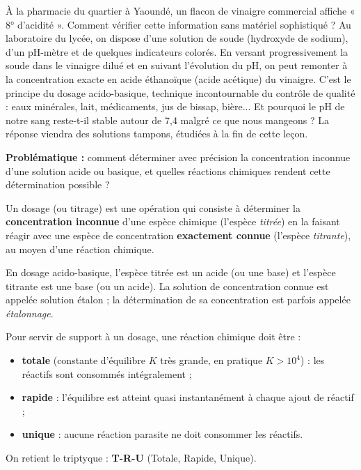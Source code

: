 \documentclass[11pt]{article}
\newcommand{\cle}[1]{{\popxbold\color{popdark}#1}}
\newcounter{popsec}
\newcounter{popsub}
\newcommand{\courssub}[1]{%
  \stepcounter{popsub}%
  \par\vspace{9pt}\noindent{\popxbold\fontsize{11.5}{13}\selectfont\color{popink}{\color{poporange}\thepopsec.\thepopsub}\hspace{6pt}#1}\par\nopagebreak\vspace{4pt}
}
\begin{document}
À la pharmacie du quartier à Yaoundé, un flacon de vinaigre commercial affiche « 8° d'acidité ». Comment vérifier cette information sans matériel sophistiqué ? Au laboratoire du lycée, on dispose d'une solution de soude (hydroxyde de sodium), d'un pH-mètre et de quelques indicateurs colorés. En versant progressivement la soude dans le vinaigre dilué et en suivant l'évolution du pH, on peut remonter à la concentration exacte en acide éthanoïque (acide acétique) du vinaigre. C'est le principe du \cle{dosage acido-basique}, technique incontournable du contrôle de qualité : eaux minérales, lait, médicaments, jus de bissap, bière... Et pourquoi le pH de notre sang reste-t-il stable autour de 7,4 malgré ce que nous mangeons ? La réponse viendra des \cle{solutions tampons}, étudiées à la fin de cette leçon.

\textbf{Problématique :} comment déterminer avec précision la concentration inconnue d'une solution acide ou basique, et quelles réactions chimiques rendent cette détermination possible ?

\courssub{La notion de dosage (titrage)}

\begin{definition}
Un \cle{dosage} (ou \cle{titrage}) est une opération qui consiste à déterminer la \textbf{concentration inconnue} d'une espèce chimique (l'espèce \emph{titrée}) en la faisant réagir avec une espèce de concentration \textbf{exactement connue} (l'espèce \emph{titrante}), au moyen d'une réaction chimique.
\end{definition}

En dosage acido-basique, l'espèce titrée est un acide (ou une base) et l'espèce titrante est une base (ou un acide). La solution de concentration connue est appelée \cle{solution étalon} ; la détermination de sa concentration est parfois appelée \emph{étalonnage}.

\begin{propriete}
Pour servir de support à un dosage, une réaction chimique doit être :
\begin{itemize}
\item \textbf{totale} (constante d'équilibre $K$ très grande, en pratique $K > 10^4$) : les réactifs sont consommés intégralement ;
\item \textbf{rapide} : l'équilibre est atteint quasi instantanément à chaque ajout de réactif ;
\item \textbf{unique} : aucune réaction parasite ne doit consommer les réactifs.
\end{itemize}
On retient le triptyque : \textbf{T-R-U} (Totale, Rapide, Unique).
\end{propriete}
\end{document}
